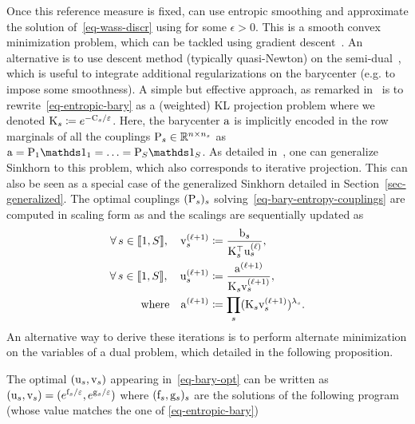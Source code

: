 Once this reference measure is fixed, can use entropic smoothing and approximate the solution of~\eqref{eq-wass-discr} using 
for some $\epsilon>0$. 
%
This is a smooth convex minimization problem, which can be tackled using gradient descent~\cite{CuturiBarycenter}. An alternative is to use descent method (typically quasi-Newton) on the semi-dual~\cite{2016-Cuturi-siims}, which is useful to integrate additional regularizations on the barycenter (e.g. to impose some smoothness).
%
A simple but effective approach, as remarked in~\cite{2015-benamou-cisc} is to rewrite~\eqref{eq-entropic-bary} as a (weighted) KL projection problem
where we denoted $\K_s \eqdef e^{-\C_s/\epsilon}$. Here, the barycenter $\a$ is implicitly encoded in the row marginals of all the couplings $\P_s \in \RR^{n \times n_s}$ as $\a = \P_1\ones_1 =  \ldots = \P_S\ones_S$.
%
As detailed in~\cite{2015-benamou-cisc}, one can generalize Sinkhorn to this problem, which also corresponds to iterative projection. This can also be seen as a special case of the generalized Sinkhorn detailed in Section~\ref{sec-generalized}.
%
The optimal couplings $(\P_s)_s$ solving~\eqref{eq-bary-entropy-couplings} are computed in scaling form as 
and the scalings are sequentially updated as
\begin{align}\label{eq-sinkhorn-bary}
	\foralls s \in \range{1,S}, \quad \itt{\vD}_s &\eqdef \frac{\b_s}{\transp{\K}_s \it{\uD}_s}, \\
	\foralls s \in \range{1,S}, \quad  \itt{\uD}_s &\eqdef \frac{\itt{\a}}{\K_s \itt{\vD}_s}, \label{eq-sinkhorn-bary-2}\\
		\qwhereq
		\itt{\a} &\eqdef \prod_s (  \K_s \itt{\vD}_s )^{\la_s}. \label{eq-sinkhorn-bary-3}
\end{align}
An alternative way to derive these iterations is to perform alternate minimization on the variables of a dual problem, which detailed in the following proposition.

\begin{prop}
	The optimal $(\uD_s,\vD_s)$ appearing in~\eqref{eq-bary-opt} can be written as $(\uD_s,\vD_s) = ( e^{\fD_s/\epsilon},e^{\gD_s/\epsilon} )$ where $( \fD_s,\gD_s )_s$ are the solutions of the following program (whose value matches the one of \eqref{eq-entropic-bary})
\end{prop}


